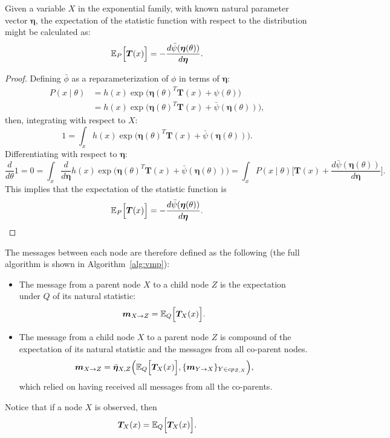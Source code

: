 \begin{proposition}\label{prop:vmp}
  Given a variable \(X\) in the exponential family, with known natural parameter vector \(\bm{\eta}\),  the expectation of the statistic function with respect to the distribution might be calculated as:
    \[
    \mathbb{E}_{P}\Big[\bm{T}(x)\Big] =   -  \frac{ d\bar{\psi}(\bm{\eta}(\theta)) }{d \bm{\eta}}.
  \]
\end{proposition}
\begin{proof}
  Defining \(\bar{\phi}\) as a reparameterization of \(\phi\) in terms of \(\bm{\eta}\):
  \[
    \begin{aligned}
      P(x\mid \theta) &= h(x)\exp \Big( \bm{\eta}{(\theta)}^{T}\bm{T}(x) + \psi(\theta) \Big)\\
       &= h(x)\exp \Big( \bm{\eta}{(\theta)}^{T}\bm{T}(x) + \bar{\psi}(\bm{\eta}(\theta)) \Big),
    \end{aligned}
  \]
  then, integrating with respect to \(X\):
  \[
    1 = \int_{x} h(x)\exp \Big( \bm{\eta}{(\theta)}^{T}\bm{T}(x) + \bar{\psi}(\bm{\eta}(\theta)) \Big).
  \]
  Differentiating with respect to \(\bm{\eta}\):
  \[
    \frac{d}{d\theta}1 = 0 = \int_{x} \frac{d}{d\bm{\eta}}h(x)\exp \Big( \bm{\eta}{(\theta)}^{T}\bm{T}(x) + \bar{\psi}(\bm{\eta}(\theta)) \Big) = \int_{x}P(x \mid \theta)\Big[ \bm{T}(x) + \frac{ d\bar{\psi}(\bm{\eta}(\theta)) }{d \bm{\eta}}\Big].
  \]
  This implies that the expectation of the statistic function is
  \[
    \mathbb{E}_{P}\Big[\bm{T}(x)\Big] =   -  \frac{ d\bar{\psi}(\bm{\eta}(\theta)) }{d \bm{\eta}}.
  \]
\end{proof}

The messages between each node are therefore defined as the following (the full algorithm is shown in Algorithm~\ref{alg:vmp}):
\begin{itemize}
  \item The message from a parent node \( X \) to a child node \( Z \) is the expectation under \( Q \) of its natural statistic:
    \[
    \bm{m}_{X \to Z} = \mathbb{E}_{Q}\Big[\bm{T}_{X}(x)\Big].
    \]
  \item The message from a child node \( X \) to a parent node \( Z \) is compound of the expectation of its natural statistic and the messages from all co-parent nodes.
    \[
    \bm{m}_{X \to Z} = \bar{\bm{\eta}}_{X,Z}\Big(\mathbb{E}_{Q}\Big[\bm{T}_X(x)\Big], \{\bm{m}_{Y \to X}\}_{Y \in cp_{Z,X}}\Big),
    \]
    which relied on having received all messages from all the co-parents.
\end{itemize}
Notice that if a node \(X\) is observed, then
\[
 \bm{T}_X(x) = \mathbb{E}_{Q}\Big[\bm{T}_X(x)\Big].
\]

